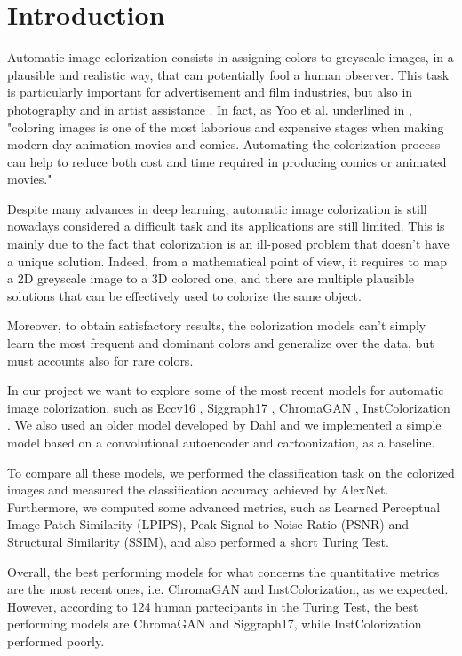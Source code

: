 \section{Introduction}
Automatic image colorization consists in assigning colors to greyscale images, in a plausible and
realistic way, that can potentially fool a human observer. This task is particularly important for advertisement
and film industries, but also in photography and in artist assistance \cite{chromagan}.
In fact, as Yoo et al. underlined in \cite{animation}, "coloring images is one of the most laborious and expensive
stages when making modern day animation movies and comics. Automating the colorization process can help to reduce
both cost and time required in producing comics or animated movies."

Despite many advances in deep learning, automatic image colorization is still nowadays considered a difficult task
and its applications are still limited. This is mainly due to the fact that colorization is an ill-posed
problem that doesn't have a unique solution. Indeed, from a mathematical point of view,
it requires to map a 2D greyscale image to a 3D colored one, and there are multiple plausible solutions that can
be effectively used to colorize the same object.

Moreover, to obtain satisfactory results, the colorization models can't simply learn the most frequent and dominant colors and generalize over the data, but must accounts also for rare colors.

In our project we want to explore some of the most recent models for automatic image colorization, such as
Eccv16 \cite{zhang}, Siggraph17 \cite{siggraph}, ChromaGAN \cite{chromagan}, InstColorization \cite{su}.
We also used an older model developed by Dahl \cite{dahl} and we implemented a simple model based on a
convolutional autoencoder and cartoonization, as a baseline.

To compare all these models, we performed the classification task on the colorized images and measured the
classification accuracy achieved by AlexNet. Furthermore, we computed some advanced metrics, such as Learned Perceptual Image Patch
Similarity (LPIPS), Peak Signal-to-Noise Ratio (PSNR) and Structural Similarity (SSIM), and also performed a short
Turing Test.

Overall, the best performing models for what concerns the quantitative metrics are the most recent ones,
i.e. ChromaGAN and InstColorization, as we expected. However, according to 124 human partecipants in the Turing Test, the best performing models
are ChromaGAN and Siggraph17, while InstColorization performed poorly.



